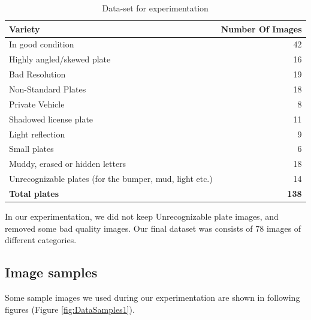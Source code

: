 \documentclass{standalone}
\begin{document}
\begin{table}    
    \caption{Data-set for experimentation}
    \label{table:Variety}
    \begin{tabular}{|l|r|}
    \hline
    {\bf Variety}  &  {\bf Number Of Images} \\ 
    \hline 
    In good condition &  42 \\ 
    Highly angled/skewed plate & 16 \\
    Bad Resolution & 19 \\ 
    Non-Standard Plates &  18\\    
    Private Vehicle & 8 \\
    Shadowed license plate & 11 \\    
    Light reflection & 9 \\
    Small plates & 6\\
    Muddy, erased or hidden letters & 18 \\
    Unrecognizable plates (for the bumper, mud, light etc.) & 14  \\
    \hline
    {\bf Total plates} & {\bf 138} \\
    \hline
    \end{tabular}
\end{table}

In our experimentation, we did not keep Unrecognizable plate images, and removed some bad quality images. Our final dataset was consists of $78$ images of different categories.

\subsection{Image samples}
Some sample images we used during our experimentation are shown in following figures (Figure \ref{fig:DataSamples1}).
\end{document}
